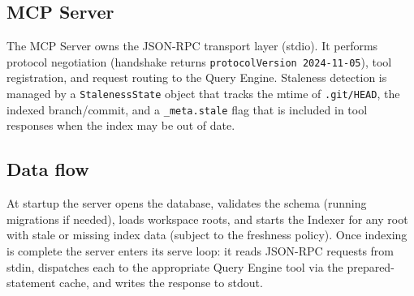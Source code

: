 \subsection{MCP Server}

The MCP Server owns the JSON-RPC transport layer (stdio). It performs
protocol negotiation (handshake returns \texttt{protocolVersion 2024-11-05}),
tool registration, and request routing to the Query Engine. Staleness
detection is managed by a \texttt{StalenessState} object that tracks the
mtime of \texttt{.git/HEAD}, the indexed branch/commit, and a
\texttt{\_meta.stale} flag that is included in tool responses when the index
may be out of date.

\subsection{Data flow}

At startup the server opens the database, validates the schema (running
migrations if needed), loads workspace roots, and starts the Indexer for any
root with stale or missing index data (subject to the freshness policy). Once
indexing is complete the server enters its serve loop: it reads JSON-RPC
requests from stdin, dispatches each to the appropriate Query Engine tool via
the prepared-statement cache, and writes the response to stdout.

